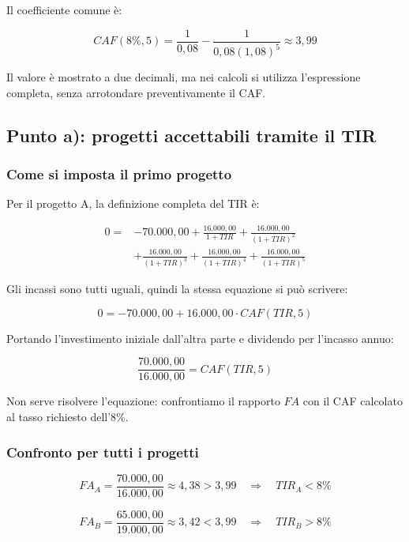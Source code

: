 \noindent Il coefficiente comune è:

\[
    CAF(8\%,5)
    =
    \frac{1}{0{,}08}
    -
    \frac{1}{0{,}08(1{,}08)^5}
    \approx 3{,}99
\]

\noindent Il valore è mostrato a due decimali, ma nei calcoli
si utilizza l'espressione completa, senza arrotondare
preventivamente il CAF.

\subsection{Punto a): progetti accettabili tramite il TIR}

\subsubsection*{Come si imposta il primo progetto}

\noindent Per il progetto A, la definizione completa del TIR è:

\[
    \begin{aligned}
        0={}&-70.000{,}00
        +\frac{16.000{,}00}{1+TIR}
        +\frac{16.000{,}00}{(1+TIR)^2}\\
        &+\frac{16.000{,}00}{(1+TIR)^3}
        +\frac{16.000{,}00}{(1+TIR)^4}
        +\frac{16.000{,}00}{(1+TIR)^5}
    \end{aligned}
\]

\noindent Gli incassi sono tutti uguali, quindi la stessa equazione
si può scrivere:

\[
    0=-70.000{,}00
    +16.000{,}00\cdot CAF(TIR,5)
\]

\noindent Portando l'investimento iniziale dall'altra parte
e dividendo per l'incasso annuo:

\[
    \frac{70.000{,}00}{16.000{,}00}
    =
    CAF(TIR,5)
\]

\noindent Non serve risolvere l'equazione: confrontiamo il rapporto
$FA$ con il CAF calcolato al tasso richiesto dell'8\%.

\subsubsection*{Confronto per tutti i progetti}

\[
    FA_A
    =
    \frac{70.000{,}00}{16.000{,}00}
    \approx 4{,}38>3{,}99
    \quad\Rightarrow\quad
    TIR_A<8\%
\]

\[
    FA_B
    =
    \frac{65.000{,}00}{19.000{,}00}
    \approx 3{,}42<3{,}99
    \quad\Rightarrow\quad
    TIR_B>8\%
\]

